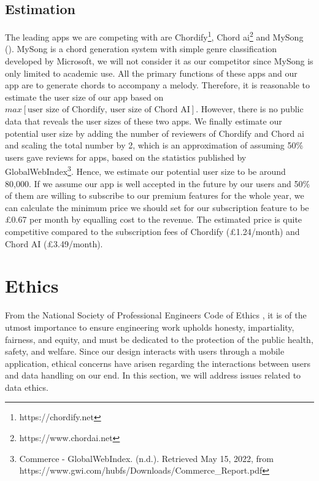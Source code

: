 \subsection{Estimation}
The leading apps we are competing with are Chordify\footnote{https://chordify.net}, Chord ai\footnote{https://www.chordai.net} and MySong (\cite{MySong}). MySong is a chord generation system with simple genre classification developed by Microsoft, we will not consider it as our competitor since MySong is only limited to academic use. All the primary functions of these apps and our app are to generate chords to accompany a melody.  Therefore, it is reasonable to estimate the user size of our app based on $max[\text{user size of Chordify, user size of Chord AI}]$. However, there is no public data that reveals the user sizes of these two apps. We finally estimate our potential user size by adding the number of reviewers of Chordify and Chord ai and scaling the total number by 2, which is an approximation of assuming 50\% users gave reviews for apps, based on the statistics published by GlobalWebIndex\footnote{Commerce - GlobalWebIndex. (n.d.). Retrieved May 15, 2022, from https://www.gwi.com/hubfs/Downloads/Commerce\_Report.pdf}. Hence, we estimate our potential user size to be around 80,000. If we assume our app is well accepted in the future by our users and 50\% of them are willing to subscribe to our premium features for the whole year, we can calculate the minimum price we should set for our subscription feature to be £0.67 per month by equalling cost to the revenue. The estimated price is quite competitive compared to the subscription fees of Chordify (£1.24/month) and Chord AI (£3.49/month).
\section{Ethics}
\label{sec:dataethics}
From the National Society of Professional Engineers Code of Ethics , it is of the utmost 
importance to ensure engineering work upholds honesty, impartiality, fairness, and equity, and must be dedicated to 
the protection of the public health, safety, and welfare. Since our design interacts with users
through a mobile application, ethical concerns have arisen regarding the interactions between users 
and data handling on our end. In this section, we will address issues related to data ethics.

